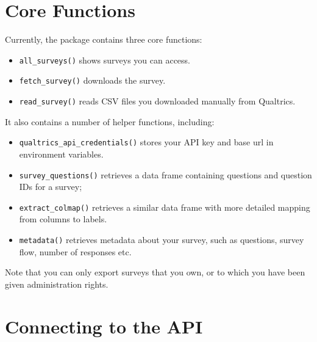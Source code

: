 \documentclass[
  letterpaper,
]{book}
\newenvironment{Shaded}{\begin{snugshade}}{\end{snugshade}}
\newcommand{\AttributeTok}[1]{\textcolor[rgb]{0.40,0.45,0.13}{#1}}
\newcommand{\FunctionTok}[1]{\textcolor[rgb]{0.28,0.35,0.67}{#1}}
\newcommand{\NormalTok}[1]{\textcolor[rgb]{0.00,0.23,0.31}{#1}}
\newcommand{\SpecialCharTok}[1]{\textcolor[rgb]{0.37,0.37,0.37}{#1}}
\providecommand{\tightlist}{%
  \setlength{\itemsep}{0pt}\setlength{\parskip}{0pt}}\usepackage{longtable,booktabs,array}
\begin{document}
\begin{Shaded}
\end{Shaded}

\hypertarget{core-functions}{%
\section{Core Functions}\label{core-functions}}

Currently, the package contains three core functions:

\begin{itemize}
\tightlist
\item
  \texttt{all\_surveys()} shows surveys you can access.
\item
  \texttt{fetch\_survey()} downloads the survey.
\item
  \texttt{read\_survey()} reads CSV files you downloaded manually from
  Qualtrics.
\end{itemize}

It also contains a number of helper functions, including:

\begin{itemize}
\tightlist
\item
  \texttt{qualtrics\_api\_credentials()} stores your API key and base
  url in environment variables.
\item
  \texttt{survey\_questions()} retrieves a data frame containing
  questions and question IDs for a survey;
\item
  \texttt{extract\_colmap()} retrieves a similar data frame with more
  detailed mapping from columns to labels.
\item
  \texttt{metadata()} retrieves metadata about your survey, such as
  questions, survey flow, number of responses etc.
\end{itemize}

Note that you can only export surveys that you own, or to which you have
been given administration rights.

\hypertarget{connecting-to-the-api}{%
\section{Connecting to the API}\label{connecting-to-the-api}}
\end{document}
